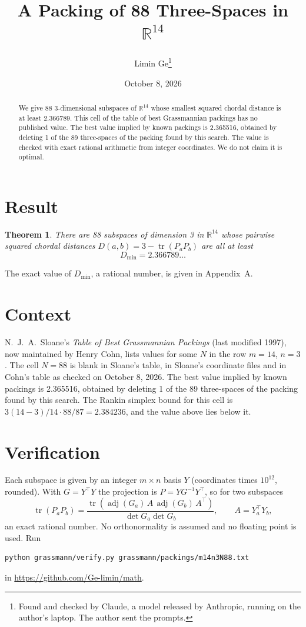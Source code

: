 \documentclass[11pt,a4paper]{article}
\title{A Packing of 88 Three-Spaces in $\mathbb{R}^{14}$}
\author{Limin Ge\thanks{Found and checked by Claude, a model released by Anthropic, running on the author's laptop. The author sent the prompts.}}
\date{October 8, 2026}
\newtheorem*{theorem}{Theorem}
\begin{document}
\maketitle
\begin{abstract}
We give 88 3-dimensional subspaces of $\mathbb{R}^{14}$ whose smallest squared chordal distance is at least 2.366789. This cell of the table of best Grassmannian packings has no published value. The best value implied by known packings is 2.365516, obtained by deleting 1 of the 89 three-spaces of the packing found by this search. The value is checked with exact rational arithmetic from integer coordinates. We do not claim it is optimal.
\end{abstract}

\section{Result}
\begin{theorem}
There are 88 subspaces of dimension 3 in $\mathbb{R}^{14}$ whose pairwise squared chordal distances $D(a,b) = 3 - \operatorname{tr}(P_aP_b)$ are all at least
\[ D_{\min} = 2.366789\ldots \]
\end{theorem}
The exact value of $D_{\min}$, a rational number, is given in Appendix~A.


\section{Context}
N.~J.~A.~Sloane's \emph{Table of Best Grassmannian Packings} (last modified 1997), now maintained by Henry Cohn, lists values for some $N$ in the row $m=14$, $n=3$. The cell $N=88$ is blank in Sloane's table, in Sloane's coordinate files and in Cohn's table as checked on October 8, 2026. The best value implied by known packings is 2.365516, obtained by deleting 1 of the 89 three-spaces of the packing found by this search. The Rankin simplex bound for this cell is $3(14-3)/14\cdot 88/87 = 2.384236$, and the value above lies below it.


\section{Verification}
Each subspace is given by an integer $m\times n$ basis $Y$ (coordinates times $10^{12}$, rounded). With $G=Y^\top Y$ the projection is $P=YG^{-1}Y^\top$, so for two subspaces
\[ \operatorname{tr}(P_aP_b)=\frac{\operatorname{tr}(\operatorname{adj}(G_a)\,A\,\operatorname{adj}(G_b)\,A^\top)}{\det G_a\det G_b},\qquad A=Y_a^\top Y_b, \]
an exact rational number. No orthonormality is assumed and no floating point is used. Run
\begin{verbatim}
python grassmann/verify.py grassmann/packings/m14n3N88.txt
\end{verbatim}
in \url{https://github.com/Ge-limin/math}.
\end{document}
